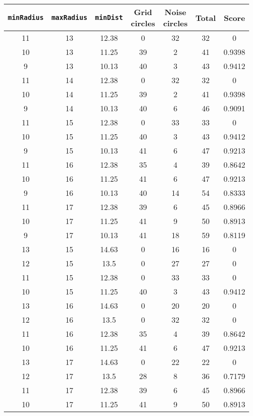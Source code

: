 \documentclass[letterpaper, 12pt]{article}
\begin{document}
\begin{longtable}{|c|c|c|c|c|c|c|}
\hline
\textbf{\texttt{minRadius}} & \textbf{\texttt{maxRadius}} & \textbf{\texttt{minDist}} & \textbf{Grid circles} & \textbf{Noise circles} & \textbf{Total} & \textbf{Score} \\
\hline
11 & 13 & 12.38 & 0 & 32 & 32 & 0 \\
\hline
10 & 13 & 11.25 & 39 & 2 & 41 & 0.9398 \\
\hline
9 & 13 & 10.13 & 40 & 3 & 43 & 0.9412 \\
\hline
11 & 14 & 12.38 & 0 & 32 & 32 & 0 \\
\hline
10 & 14 & 11.25 & 39 & 2 & 41 & 0.9398 \\
\hline
9 & 14 & 10.13 & 40 & 6 & 46 & 0.9091 \\
\hline
11 & 15 & 12.38 & 0 & 33 & 33 & 0 \\
\hline
10 & 15 & 11.25 & 40 & 3 & 43 & 0.9412 \\
\hline
9 & 15 & 10.13 & 41 & 6 & 47 & 0.9213 \\
\hline
11 & 16 & 12.38 & 35 & 4 & 39 & 0.8642 \\
\hline
10 & 16 & 11.25 & 41 & 6 & 47 & 0.9213 \\
\hline
9 & 16 & 10.13 & 40 & 14 & 54 & 0.8333 \\
\hline
11 & 17 & 12.38 & 39 & 6 & 45 & 0.8966 \\
\hline
10 & 17 & 11.25 & 41 & 9 & 50 & 0.8913 \\
\hline
9 & 17 & 10.13 & 41 & 18 & 59 & 0.8119 \\
\hline
13 & 15 & 14.63 & 0 & 16 & 16 & 0 \\
\hline
12 & 15 & 13.5 & 0 & 27 & 27 & 0 \\
\hline
11 & 15 & 12.38 & 0 & 33 & 33 & 0 \\
\hline
10 & 15 & 11.25 & 40 & 3 & 43 & 0.9412 \\
\hline
13 & 16 & 14.63 & 0 & 20 & 20 & 0 \\
\hline
12 & 16 & 13.5 & 0 & 32 & 32 & 0 \\
\hline
11 & 16 & 12.38 & 35 & 4 & 39 & 0.8642 \\
\hline
10 & 16 & 11.25 & 41 & 6 & 47 & 0.9213 \\
\hline
13 & 17 & 14.63 & 0 & 22 & 22 & 0 \\
\hline
12 & 17 & 13.5 & 28 & 8 & 36 & 0.7179 \\
\hline
11 & 17 & 12.38 & 39 & 6 & 45 & 0.8966 \\
\hline
10 & 17 & 11.25 & 41 & 9 & 50 & 0.8913 \\

\end{longtable}
\end{document}
